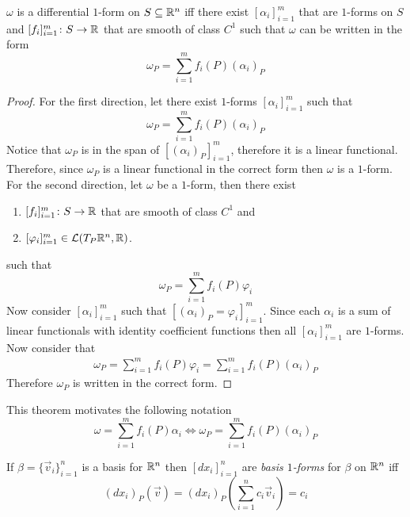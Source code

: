 \documentclass[notes]{subfiles}
\begin{document}
\begin{theorem} \label{forms_are_sum_of_forms}
    $\omega$ is a differential $1$-form on $S \subseteq \mathbb{R}^n$ iff there exist $[\alpha_i]_{i = 1}^m$ that are $1$-forms on $S$ and $[f_i]_{i = 1}^m\colon S \to \mathbb{R}$ that are smooth of class $C^1$ such that $\omega$ can be written in the form
    \[
        \omega_P = \sum_{i = 1}^m f_i(P)(\alpha_i)_P
    \]
\end{theorem}
\begin{proof}
    For the first direction, let there exist $1$-forms $[\alpha_i]_{i = 1}^m$ such that
    \[
        \omega_P = \sum_{i = 1}^m f_i(P)(\alpha_i)_P
    \]
    Notice that $\omega_P$ is in the span of $[(\alpha_i)_P]_{i = 1}^m$, therefore it is a linear functional. Therefore, since $\omega_P$ is a linear functional in the correct form then $\omega$ is a $1$-form. \\
    For the second direction, let $\omega$ be a $1$-form, then there exist
    \begin{enumerate}[label = \arabic*)]
        \item $[f_i]_{i = 1}^m\colon S \to \mathbb{R}$ that are smooth of class $C^1$ and
        \item $[\varphi_i]_{i = 1}^m \in \mathcal{L}(T_P \mathbb{R}^n, \mathbb{R})$.
    \end{enumerate}
    such that
    \[
        \omega_P = \sum_{i = 1}^m f_i(P)\varphi_i
    \]
    Now consider $[\alpha_i]_{i = 1}^m$ such that $[(\alpha_i)_P = \varphi_i]_{i = 1}^m$. Since each $\alpha_i$ is a sum of linear functionals with identity coefficient functions then all $[\alpha_i]_{i = 1}^m$ are $1$-forms. Now consider that
    \begin{align*}
        \omega_P = \sum_{i = 1}^m f_i(P)\varphi_i = \sum_{i = 1}^m f_i(P)(\alpha_i)_P
    \end{align*}
    Therefore $\omega_P$ is written in the correct form.
\end{proof}

This theorem motivates the following notation
\[
    \omega = \sum_{i = 1}^m f_i(P)\alpha_i \iff \omega_P = \sum_{i = 1}^m f_i(P)(\alpha_i)_P
\]

\begin{definition}
    If $\beta = \{ \vec{v}_i \}_{i = 1}^n$ is a basis for $\mathbb{R}^n$ then $[dx_i]_{i = 1}^n$ are \textit{basis $1$-forms} for $\beta$ on $\mathbb{R}^n$ iff
    \[
        (dx_i)_P(\vec{v}) = (dx_i)_P\left( \sum_{i = 1}^n c_i\vec{v}_i \right) = c_i
    \]
\end{definition}
\end{document}
